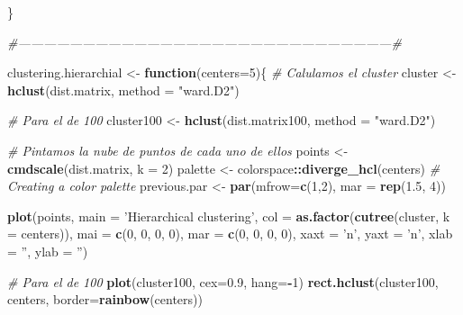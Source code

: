 \documentclass[spanish,]{article}
\newenvironment{Shaded}{\begin{snugshade}}{\end{snugshade}}
\newcommand{\KeywordTok}[1]{\textcolor[rgb]{0.13,0.29,0.53}{\textbf{#1}}}
\newcommand{\DataTypeTok}[1]{\textcolor[rgb]{0.13,0.29,0.53}{#1}}
\newcommand{\DecValTok}[1]{\textcolor[rgb]{0.00,0.00,0.81}{#1}}
\newcommand{\FloatTok}[1]{\textcolor[rgb]{0.00,0.00,0.81}{#1}}
\newcommand{\StringTok}[1]{\textcolor[rgb]{0.31,0.60,0.02}{#1}}
\newcommand{\CommentTok}[1]{\textcolor[rgb]{0.56,0.35,0.01}{\textit{#1}}}
\newcommand{\ControlFlowTok}[1]{\textcolor[rgb]{0.13,0.29,0.53}{\textbf{#1}}}
\newcommand{\OperatorTok}[1]{\textcolor[rgb]{0.81,0.36,0.00}{\textbf{#1}}}
\newcommand{\NormalTok}[1]{#1}
\begin{document}
\begin{Shaded}
\begin{Highlighting}[]
\NormalTok{\}}

\CommentTok{#---------------------------------------------------------------------------------------#}

\NormalTok{clustering.hierarchial <-}\StringTok{ }\ControlFlowTok{function}\NormalTok{(}\DataTypeTok{centers=}\DecValTok{5}\NormalTok{)\{}
  \CommentTok{# Calulamos el cluster}
\NormalTok{  cluster <-}\StringTok{ }\KeywordTok{hclust}\NormalTok{(dist.matrix, }\DataTypeTok{method =} \StringTok{"ward.D2"}\NormalTok{) }
  
  \CommentTok{# Para el de 100}
\NormalTok{  cluster100 <-}\StringTok{ }\KeywordTok{hclust}\NormalTok{(dist.matrix100, }\DataTypeTok{method =} \StringTok{"ward.D2"}\NormalTok{)}
  
  \CommentTok{# Pintamos la nube de puntos de cada uno de ellos }
\NormalTok{  points <-}\StringTok{ }\KeywordTok{cmdscale}\NormalTok{(dist.matrix, }\DataTypeTok{k =} \DecValTok{2}\NormalTok{) }
\NormalTok{  palette <-}\StringTok{ }\NormalTok{colorspace}\OperatorTok{::}\KeywordTok{diverge_hcl}\NormalTok{(centers) }\CommentTok{# Creating a color palette }
\NormalTok{  previous.par <-}\StringTok{ }\KeywordTok{par}\NormalTok{(}\DataTypeTok{mfrow=}\KeywordTok{c}\NormalTok{(}\DecValTok{1}\NormalTok{,}\DecValTok{2}\NormalTok{), }\DataTypeTok{mar =} \KeywordTok{rep}\NormalTok{(}\FloatTok{1.5}\NormalTok{, }\DecValTok{4}\NormalTok{))}
  
  \KeywordTok{plot}\NormalTok{(points, }\DataTypeTok{main =} \StringTok{'Hierarchical clustering'}\NormalTok{, }
       \DataTypeTok{col =} \KeywordTok{as.factor}\NormalTok{(}\KeywordTok{cutree}\NormalTok{(cluster, }\DataTypeTok{k =}\NormalTok{ centers)), }
       \DataTypeTok{mai =} \KeywordTok{c}\NormalTok{(}\DecValTok{0}\NormalTok{, }\DecValTok{0}\NormalTok{, }\DecValTok{0}\NormalTok{, }\DecValTok{0}\NormalTok{), }\DataTypeTok{mar =} \KeywordTok{c}\NormalTok{(}\DecValTok{0}\NormalTok{, }\DecValTok{0}\NormalTok{, }\DecValTok{0}\NormalTok{, }\DecValTok{0}\NormalTok{),  }
       \DataTypeTok{xaxt =} \StringTok{'n'}\NormalTok{, }\DataTypeTok{yaxt =} \StringTok{'n'}\NormalTok{, }\DataTypeTok{xlab =} \StringTok{''}\NormalTok{, }\DataTypeTok{ylab =} \StringTok{''}\NormalTok{) }
  
  \CommentTok{# Para el de 100}
  \KeywordTok{plot}\NormalTok{(cluster100, }\DataTypeTok{cex=}\FloatTok{0.9}\NormalTok{, }\DataTypeTok{hang=}\OperatorTok{-}\DecValTok{1}\NormalTok{)}
  \KeywordTok{rect.hclust}\NormalTok{(cluster100, centers, }\DataTypeTok{border=}\KeywordTok{rainbow}\NormalTok{(centers))}
  

\end{Highlighting}
\end{Shaded}
\end{document}
